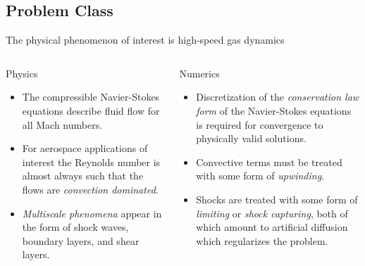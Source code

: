 \documentclass[compress,11pt]{beamer}
\begin{document}
\subsection{Problem Class}
\frame
 {
   \vspace{-2em}
   The physical phenomenon of interest is high-speed gas dynamics
   \footnotesize
   \begin{columns}[t]
     \begin{block}{Physics}
       \begin{itemize}
         \item The compressible Navier-Stokes equations describe fluid flow for all Mach numbers.
	 \item For aerospace applications of interest the Reynolds number is almost always such that the flows are \emph{convection dominated}.
	 \item \emph{Multiscale phenomena} appear in the form of shock waves, boundary layers, and shear layers.
       \end{itemize}
     \end{block}
     \begin{block}{Numerics}
       \begin{itemize}
         \item Discretization of the \emph{conservation law form} of the Navier-Stokes equations is required for convergence to physically valid solutions.
	 \item Convective terms must be treated with some form of \emph{upwinding}.
	 \item Shocks are treated with some form of \emph{limiting} or \emph{shock capturing}, both of which amount to artificial diffusion which regularizes the problem.
       \end{itemize}
     \end{block}
   \end{columns}
   \normalsize
 }
 
\end{document}
